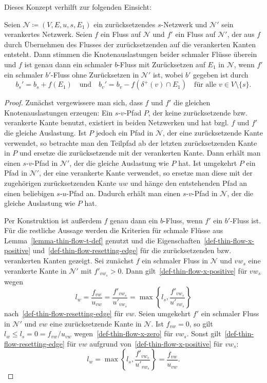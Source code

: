 Dieses Konzept verhilft zur folgenden Einsicht:
\begin{lemma}\label{lemma-thin-flows-anchored-networks}
	Seien $\mathcal{N}\coloneq (V, E, u, s, E_1)$ ein zurücksetzendes $s$-Netzwerk und $\mathcal{N}'$ sein verankertes Netzwerk.
	Seien $f$ ein Fluss auf $\mathcal{N}$ und $f'$ ein Fluss auf $\mathcal{N}'$, der aus $f$ durch Übernehmen des Flusses der zurücksetzenden auf die verankerten Kanten entsteht.
	Dann stimmen die Knotenauslastungen beider schmaler Flüsse überein und
	$f$ ist genau dann ein schmaler $b$-Fluss mit Zurücksetzen auf $E_1$ in $\mathcal{N}$, wenn $f'$ ein schmaler $b'$-Fluss ohne Zurücksetzen in $\mathcal{N}'$ ist, wobei $b'$ gegeben ist durch
	\[
		b_s' = b_s + f(E_1) \text{~~ und ~~} b_v' = b_v - f(\delta^+(v)\cap E_1) \text{~~ für alle $v\in V\setminus \{s \}$}.
	\]
\end{lemma}
\begin{proof}
	Zunächst vergewissere man sich, dass $f$ und $f'$ die gleichen Knotenauslastungen erzeugen:
	Ein $s$-$v$-Pfad $P$, der keine zurücksetzende bzw. verankerte Kante benutzt, existiert in beiden Netzwerken und hat bzgl. $f$ und $f'$ die gleiche Auslastung.
	Ist $P$ jedoch ein Pfad in $\mathcal{N}$, der eine zurücksetzende Kante verwendet, so betrachte man den Teilpfad ab der letzten zurücksetzenden Kante in $P$ und ersetze die zurücksetzende mit der verankerten Kante.
	Dann erhält man einen $s$-$v$-Pfad in $\mathcal{N}'$, der die gleiche Auslastung wie $P$ hat.
	Ist umgekehrt $P$ ein Pfad in $\mathcal{N}'$, der eine verankerte Kante verwendet, so ersetze man diese mit der zugehörigen zurücksetzenden Kante $uw$ und hänge den entstehenden Pfad an einen beliebigen $s$-$u$-Pfad an.
	Dadurch erhält man einen $s$-$v$-Pfad in $\mathcal{N}$, der die gleiche Auslastung wie $P$ hat.
	
	Per Konstruktion ist außerdem $f$ genau dann ein $b$-Fluss, wenn $f'$ ein $b'$-Fluss ist.
	Für die restliche Aussage werden die Kriterien für schmale Flüsse aus Lemma~\ref{lemma-thin-flow-t-def} genutzt und die Eigenschaften~\ref{def-thin-flow-x-positive} und~\ref{def-thin-flow-resetting-edge} für die zurücksetzenden bzw. verankerten Kanten gezeigt.
	Sei zunächst $f$ ein schmaler Fluss in $\mathcal{N}$ und $vw_s$ eine verankerte Kante in $\mathcal{N'}$ mit $f'_{vw_s} > 0$.
	Dann gilt~\ref{def-thin-flow-x-positive} für $vw_s$ wegen
	\[ l_w = \frac{f_{vw}}{u_{vw}} = \frac{f'_{vw_s}}{u'_{vw_s}} = \max\left\{ l_s, \frac{f'_{vw_s}}{u'_{vw_s}} \right\} \]
	nach~\ref{def-thin-flow-resetting-edge} für $vw$.
	Seien umgekehrt $f'$ ein schmaler Fluss in $\mathcal{N}'$ und $vw$ eine zurück\-setzende Kante in $\mathcal{N}$.
	Ist $f_{vw} = 0$, so gilt $l_w \leq l_s = 0 = f_{vw}/u_{vw}$ wegen~\ref{def-thin-flow-x-zero} für $vw_s$.
	Sonst gilt~\ref{def-thin-flow-resetting-edge} für $vw$ aufgrund von~\ref{def-thin-flow-x-positive} für $vw_s$:
	\[
		l_w = \max\left\{ l_s, \frac{f'_{vw_s}}{u'_{vw_s}} \right\} = \frac{f_{vw}}{u_{vw}}.
	\]
\end{proof}

